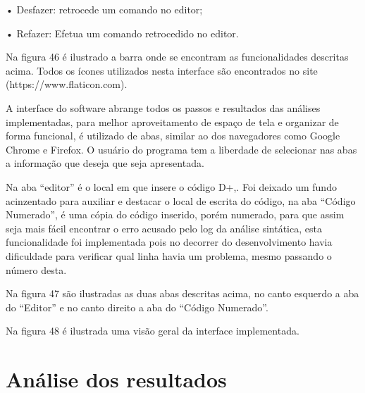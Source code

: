 \documentclass[12pt,oneside,a4paper,chapter=TITLE,section=TITLE,sumario=tradicional]{abntex2}
\begin{document}
•	Desfazer: retrocede um comando no editor;

•	Refazer: Efetua um comando retrocedido no editor.

Na figura 46 é ilustrado a barra onde se encontram as funcionalidades descritas acima. Todos os ícones utilizados nesta interface são encontrados no site (https://www.flaticon.com).

\begin{figure}[htb]
\end{figure} 

A interface do software abrange todos os passos e resultados das análises implementadas, para melhor aproveitamento de espaço de tela e organizar de forma funcional, é utilizado de abas, similar ao dos navegadores como Google Chrome e Firefox. O usuário do programa tem a liberdade de selecionar nas abas a informação que deseja que seja apresentada. 

Na aba “editor” é o local em que insere o código D+,. Foi deixado um fundo acinzentado para auxiliar e destacar o local de escrita do código, na aba “Código Numerado”, é uma cópia do código inserido, porém numerado, para que assim seja mais fácil encontrar o erro acusado pelo log da análise sintática, esta funcionalidade foi implementada pois no decorrer do desenvolvimento havia dificuldade para verificar qual linha havia um problema, mesmo passando o número desta. 

Na figura 47 são ilustradas as duas abas descritas acima, no canto esquerdo a aba do “Editor” e no canto direito a aba do “Código Numerado”. 

\begin{figure}[htb]
\end{figure}

Na figura 48 é ilustrada uma visão geral da interface implementada. 

\begin{figure}[htb]
\end{figure}


\chapter{Análise dos resultados}
\label{cap:analiseresultados}
\end{document}
